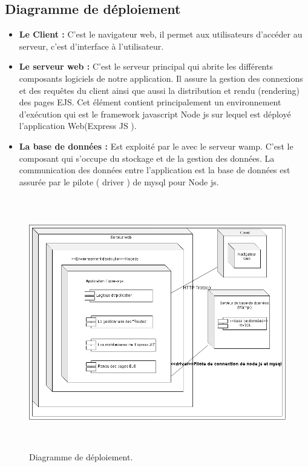 \subsection{Diagramme de d\'{e}ploiement}


\begin{itemize}
\item{ \textbf{Le Client :} C'est le navigateur web, il permet aux utilisateurs d'acc\'{e}der au
serveur, c'est d'interface \`{a} l'utilisateur.}

\item{ \textbf{Le serveur web :} C'est le serveur principal qui abrite les diff\'{e}rents composants logiciels de
notre application. Il assure la gestion des connexions et des requ\^{e}tes du client
ainsi que aussi la distribution et rendu (rendering) des pages EJS.
Cet \'{e}l\'{e}ment contient principalement un environnement d'ex\'{e}cution qui est
le framework javascript Node js sur lequel est d\'{e}ploy\'{e} l'application
Web(Express JS ).}

\item{ \textbf{La base de donn\'{e}es :} Est exploit\'{e} par le avec le serveur wamp.
C'est le composant qui s'occupe du stockage et de la gestion des donn\'{e}es.
La communication des donn\'{e}es entre l'application est la base de donn\'{e}es
est assur\'{e}e par le pilote ( driver ) de mysql pour Node js.}


\end{itemize}





\begin{figure}[H]
\center
\includegraphics[width=13cm,height=11cm]{./figures/deployement.png}
\caption{Diagramme de d\'{e}ploiement.}
\end{figure}
\FloatBarrier
